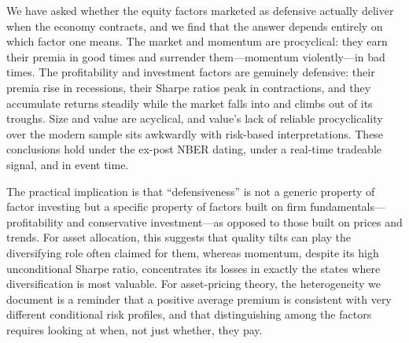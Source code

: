 \documentclass[12pt]{article}
\begin{document}
We have asked whether the equity factors marketed as defensive actually deliver
when the economy contracts, and we find that the answer depends entirely on
which factor one means. The market and momentum are procyclical: they earn their
premia in good times and surrender them---momentum violently---in bad times. The
profitability and investment factors are genuinely defensive: their premia rise
in recessions, their Sharpe ratios peak in contractions, and they accumulate
returns steadily while the market falls into and climbs out of its troughs. Size
and value are acyclical, and value's lack of reliable procyclicality over the
modern sample sits awkwardly with risk-based interpretations. These conclusions
hold under the ex-post NBER dating, under a real-time tradeable signal, and in
event time.

The practical implication is that ``defensiveness'' is not a generic property of
factor investing but a specific property of factors built on firm
fundamentals---profitability and conservative investment---as opposed to those
built on prices and trends. For asset allocation, this suggests that quality
tilts can play the diversifying role often claimed for them, whereas momentum,
despite its high unconditional Sharpe ratio, concentrates its losses in exactly
the states where diversification is most valuable. For asset-pricing theory, the
heterogeneity we document is a reminder that a positive average premium is
consistent with very different conditional risk profiles, and that distinguishing
among the factors requires looking at when, not just whether, they pay.

\clearpage
{}


\end{document}

